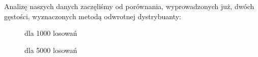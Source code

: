 \documentclass{article}
\begin{document}
\begin{enumerate}
		Analizę naszych danych zaczęliśmy od porównania, wyprowadzonych już, dwóch gęstości, wyznaczonych metodą odwrotnej dystrybuanty:
		\begin{figure}[h]
			\begin{center}
			\caption{dla 1000 losowań}
			\end{center}
		\end{figure} 
	
		\begin{figure}[h]
			\begin{center}
				\caption{dla 5000 losowań}
			\end{center}
		\end{figure}
	

\end{enumerate}
\end{document}
